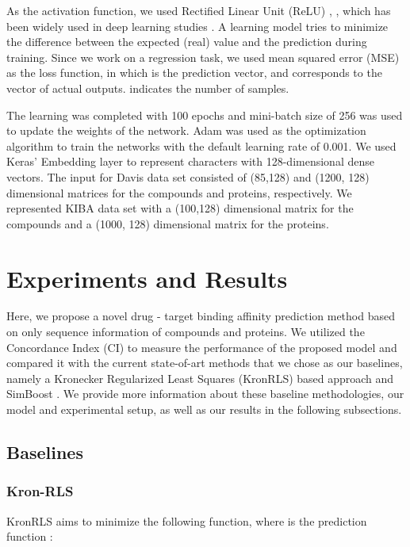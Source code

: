 \documentclass[11pt,letterpaper]{article}
\begin{document}
As the activation function, we used Rectified Linear Unit (ReLU) \cite{nair2010rectified}, ,  which has been widely used in deep learning studies \cite{lecun2015deep}. A learning model tries to minimize the difference between the expected (real) value and the prediction during training. Since we work on a regression task, we used mean squared error (MSE) as the loss function, in which  is the prediction vector, and  corresponds to the vector of actual outputs.  indicates the number of samples.

The learning  was completed with 100 epochs and mini-batch size of 256 was used to update the weights of the network. Adam was used as the optimization algorithm to train the networks \cite{kingma2014adam} with the default learning rate  of 0.001.
We used Keras' Embedding layer to represent characters with 128-dimensional dense vectors. The input for Davis data set consisted of (85,128) and (1200, 128) dimensional matrices for the compounds and proteins, respectively. We represented KIBA data set with a (100,128) dimensional matrix for the compounds and a (1000, 128) dimensional matrix for the  proteins. 



\section*{Experiments and Results}


Here, we propose a novel drug - target binding affinity prediction method based on only sequence information of compounds and proteins. We utilized the Concordance Index (CI) to measure the performance of the proposed model  and compared it with the current state-of-art methods that we chose as our baselines, namely a Kronecker Regularized Least Squares (KronRLS) based approach \cite{pahikkala2014toward} and SimBoost \cite{he2017simboost}.  We provide more information about these baseline methodologies, our model and experimental setup, as well as our results in the following subsections.

\subsection*{Baselines}

\subsubsection*{Kron-RLS}
KronRLS  aims to minimize the following function, where  is the prediction function \cite{pahikkala2014toward}:
\end{document}
